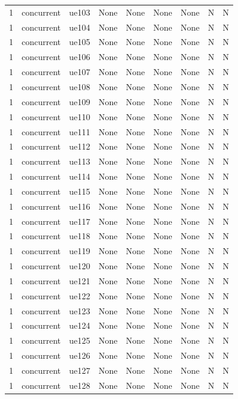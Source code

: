 \begin{table}[ht]
\begin{tabular}{|c|c|c|c|c|c|c|c|c|}
1 & concurrent & ue103 & None & None & None & None & N & N \\
1 & concurrent & ue104 & None & None & None & None & N & N \\
1 & concurrent & ue105 & None & None & None & None & N & N \\
1 & concurrent & ue106 & None & None & None & None & N & N \\
1 & concurrent & ue107 & None & None & None & None & N & N \\
1 & concurrent & ue108 & None & None & None & None & N & N \\
1 & concurrent & ue109 & None & None & None & None & N & N \\
1 & concurrent & ue110 & None & None & None & None & N & N \\
1 & concurrent & ue111 & None & None & None & None & N & N \\
1 & concurrent & ue112 & None & None & None & None & N & N \\
1 & concurrent & ue113 & None & None & None & None & N & N \\
1 & concurrent & ue114 & None & None & None & None & N & N \\
1 & concurrent & ue115 & None & None & None & None & N & N \\
1 & concurrent & ue116 & None & None & None & None & N & N \\
1 & concurrent & ue117 & None & None & None & None & N & N \\
1 & concurrent & ue118 & None & None & None & None & N & N \\
1 & concurrent & ue119 & None & None & None & None & N & N \\
1 & concurrent & ue120 & None & None & None & None & N & N \\
1 & concurrent & ue121 & None & None & None & None & N & N \\
1 & concurrent & ue122 & None & None & None & None & N & N \\
1 & concurrent & ue123 & None & None & None & None & N & N \\
1 & concurrent & ue124 & None & None & None & None & N & N \\
1 & concurrent & ue125 & None & None & None & None & N & N \\
1 & concurrent & ue126 & None & None & None & None & N & N \\
1 & concurrent & ue127 & None & None & None & None & N & N \\
1 & concurrent & ue128 & None & None & None & None & N & N \\

\end{tabular}
\end{table}
